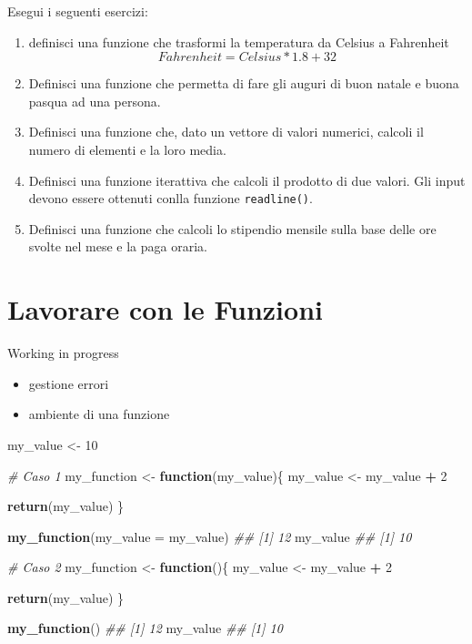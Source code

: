\documentclass[
]{book}
\newenvironment{Shaded}{\begin{snugshade}}{\end{snugshade}}
\newcommand{\CommentTok}[1]{\textcolor[rgb]{0.56,0.35,0.01}{\textit{#1}}}
\newcommand{\ControlFlowTok}[1]{\textcolor[rgb]{0.13,0.29,0.53}{\textbf{#1}}}
\newcommand{\DataTypeTok}[1]{\textcolor[rgb]{0.13,0.29,0.53}{#1}}
\newcommand{\DecValTok}[1]{\textcolor[rgb]{0.00,0.00,0.81}{#1}}
\newcommand{\KeywordTok}[1]{\textcolor[rgb]{0.13,0.29,0.53}{\textbf{#1}}}
\newcommand{\NormalTok}[1]{#1}
\newcommand{\OperatorTok}[1]{\textcolor[rgb]{0.81,0.36,0.00}{\textbf{#1}}}
\newcommand{\StringTok}[1]{\textcolor[rgb]{0.31,0.60,0.02}{#1}}
\providecommand{\tightlist}{%
  \setlength{\itemsep}{0pt}\setlength{\parskip}{0pt}}
\begin{document}
Esegui i seguenti esercizi:

\begin{enumerate}
\def\labelenumi{\arabic{enumi}.}
\tightlist
\item
  definisci una funzione che trasformi la temperatura da Celsius a Fahrenheit
  \[
    Fahrenheit = Celsius *1.8 + 32
    \]
\item
  Definisci una funzione che permetta di fare gli auguri di buon natale e buona pasqua ad una persona.
\item
  Definisci una funzione che, dato un vettore di valori numerici, calcoli il numero di elementi e la loro media.
\item
  Definisci una funzione iterattiva che calcoli il prodotto di due valori. Gli input devono essere ottenuti conlla funzione \texttt{readline()}.
\item
  Definisci una funzione che calcoli lo stipendio mensile sulla base delle ore svolte nel mese e la paga oraria.
\end{enumerate}

\hypertarget{lavorare-con-le-funzioni}{%
\section{Lavorare con le Funzioni}\label{lavorare-con-le-funzioni}}

Working in progress

\begin{itemize}
\tightlist
\item
  gestione errori
\item
  ambiente di una funzione
\end{itemize}

\begin{Shaded}
\begin{Highlighting}[]

\NormalTok{my_value <-}\StringTok{ }\DecValTok{10}

\CommentTok{# Caso 1}
\NormalTok{my_function <-}\StringTok{ }\ControlFlowTok{function}\NormalTok{(my_value)\{}
\NormalTok{  my_value <-}\StringTok{ }\NormalTok{my_value }\OperatorTok{+}\StringTok{ }\DecValTok{2}
  
  \KeywordTok{return}\NormalTok{(my_value)}
\NormalTok{\}}

\KeywordTok{my_function}\NormalTok{(}\DataTypeTok{my_value =}\NormalTok{ my_value)}
\CommentTok{## [1] 12}
\NormalTok{my_value}
\CommentTok{## [1] 10}

\CommentTok{# Caso 2}
\NormalTok{my_function <-}\StringTok{ }\ControlFlowTok{function}\NormalTok{()\{}
\NormalTok{  my_value <-}\StringTok{ }\NormalTok{my_value }\OperatorTok{+}\StringTok{ }\DecValTok{2}
  
  \KeywordTok{return}\NormalTok{(my_value)}
\NormalTok{\}}

\KeywordTok{my_function}\NormalTok{()}
\CommentTok{## [1] 12}
\NormalTok{my_value}
\CommentTok{## [1] 10}
\end{Highlighting}
\end{Shaded}
\end{document}
